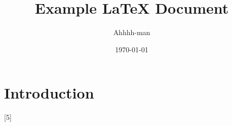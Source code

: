 \documentclass{article}
\title{Example \LaTeX{} Document}
\author{Ahhhh-man}
\date{\today}
\begin{document}
\maketitle

\section{Introduction}
[5]
\end{document}
